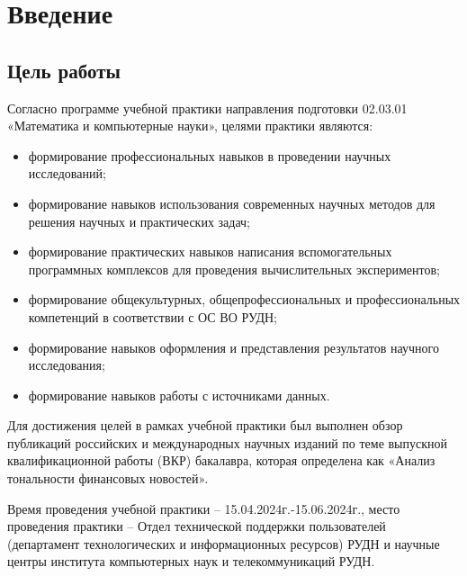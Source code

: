\section{Введение}

\subsection{Цель работы}


Согласно программе учебной практики направления подготовки 02.03.01 «Математика и компьютерные науки», целями практики являются:
\begin{itemize}
   \item формирование профессиональных навыков в проведении научных исследований;
   \item формирование навыков использования современных научных методов для решения научных и практических задач;
   \item формирование практических навыков написания вспомогательных программных комплексов для проведения вычислительных экспериментов;
   \item формирование общекультурных, общепрофессиональных и профессиональных компетенций в соответствии с ОС ВО РУДН;
   \item формирование навыков оформления и представления результатов научного исследования;
   \item формирование навыков работы с источниками данных.
\end{itemize}

Для достижения целей в рамках учебной практики был выполнен обзор публикаций российских и международных научных изданий по теме выпускной квалификационной работы (ВКР) бакалавра, которая определена как «Анализ тональности финансовых новостей».

Время проведения учебной практики – 15.04.2024г.-15.06.2024г., место проведения практики – Отдел технической поддержки пользователей (департамент технологических и информационных ресурсов) РУДН и научные центры института компьютерных наук и телекоммуникаций РУДН.

